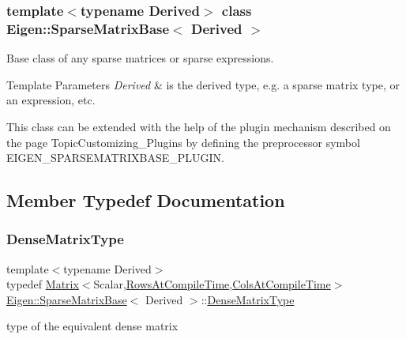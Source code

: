\subsubsection*{template$<$typename Derived$>$\newline
class Eigen\+::\+Sparse\+Matrix\+Base$<$ Derived $>$}

Base class of any sparse matrices or sparse expressions. 


\begin{DoxyTemplParams}{Template Parameters}
{\em Derived} & is the derived type, e.\+g. a sparse matrix type, or an expression, etc.\\
\hline
\end{DoxyTemplParams}
This class can be extended with the help of the plugin mechanism described on the page Topic\+Customizing\+\_\+\+Plugins by defining the preprocessor symbol {\ttfamily E\+I\+G\+E\+N\+\_\+\+S\+P\+A\+R\+S\+E\+M\+A\+T\+R\+I\+X\+B\+A\+S\+E\+\_\+\+P\+L\+U\+G\+IN}. 

\subsection{Member Typedef Documentation}
\mbox{\label{class_eigen_1_1_sparse_matrix_base_acca1ed7c478dbd2b36b7ef14cb781cff}} 
\subsubsection{\texorpdfstring{DenseMatrixType}{DenseMatrixType}}
{\footnotesize\ttfamily template$<$typename Derived$>$ \\
typedef \mbox{\hyperlink{class_eigen_1_1_matrix}{Matrix}}$<$Scalar,\mbox{\hyperlink{class_eigen_1_1_sparse_matrix_base_a11b30ed44f64a137b4fa1ee638ca2d36a456cda7b9d938e57194036a41d634604}{Rows\+At\+Compile\+Time}},\mbox{\hyperlink{class_eigen_1_1_sparse_matrix_base_a11b30ed44f64a137b4fa1ee638ca2d36a27ba349f075d026c1f51d1ec69aa5b14}{Cols\+At\+Compile\+Time}}$>$ \mbox{\hyperlink{class_eigen_1_1_sparse_matrix_base}{Eigen\+::\+Sparse\+Matrix\+Base}}$<$ Derived $>$\+::\mbox{\hyperlink{class_eigen_1_1_sparse_matrix_base_acca1ed7c478dbd2b36b7ef14cb781cff}{Dense\+Matrix\+Type}}}

type of the equivalent dense matrix \mbox{\label{class_eigen_1_1_sparse_matrix_base_aaec8ace6efb785c81d442931c3248d88}} 
